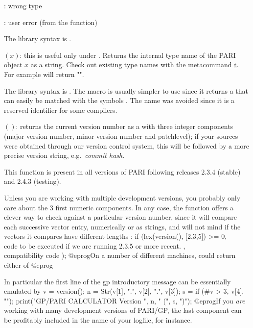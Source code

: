 : wrong type

: user error (from the  function)

The library syntax is .

$(x)$: \label{se:type}this is useful only under . Returns the internal type name of
the PARI object $x$ as a  string. Check out existing type names with the
metacommand \b{t}. For example  will return "".

The library syntax is .
The macro  is usually simpler to use since it returns a
 that can easily be matched with the symbols \typ{*}. The name
 was avoided since it is a reserved identifier for some compilers.

$()$: \label{se:version}returns the current version number as a  with three integer
components (major version number, minor version number and patchlevel);
if your sources were obtained through our version control system, this will
be followed by a more precise version string, e.g.~\emph{commit
hash}.

This function is present in all versions of PARI following releases 2.3.4
(stable) and 2.4.3 (testing).

Unless you are working with multiple development versions, you probably only
care about the 3 first numeric components. In any case, the  function
offers a clever way to check against a particular version number, since it will
compare each successive vector entry, numerically or as strings, and will not
mind if the vectors it compares have different lengths :
\bprog
   if (lex(version(), [2,3,5]) >= 0,
     \\ code to be executed if we are running 2.3.5 or more recent.
   ,
     \\ compatibility code
   );
@eprog\noindent On a number of different machines,  could return either of
\bprog
@eprog

In particular the first line of the gp introductory message can be essentially
emulated by
\bprog
   v = version();
   n = Str(v[1], ".", v[2], ".", v[3]);
   s = if (#v > 3, v[4], "");
   print("GP/PARI CALCULATOR Version ", n, " (", s, ")");
 @eprog\noindent If you \emph{are} working with many development versions of
 PARI/GP, the last component can be profitably included in the name of
 your logfile, for instance.

